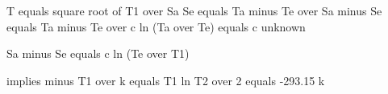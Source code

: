 T equals square root of T1 over Sa Se equals Ta minus Te over Sa minus Se equals Ta minus Te over c ln (Ta over Te) equals c unknown

Sa minus Se equals c ln (Te over T1)

implies minus T1 over k equals T1 ln T2 over 2 equals -293.15 k